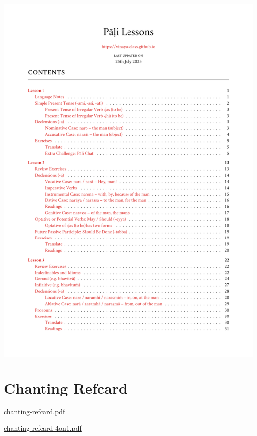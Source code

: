 \href{./includes/docs/pali-lessons.pdf}{\includegraphics{./includes/docs/pali-lessons-thumb.png}}

\section{Chanting Refcard}

\href{./includes/docs/chanting-refcard.pdf}{chanting-refcard.pdf}

\href{./includes/docs/chanting-refcard-4on1.pdf}{chanting-refcard-4on1.pdf}

